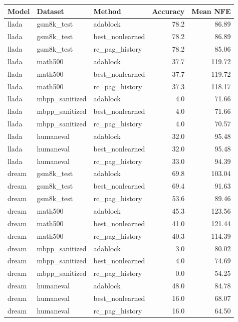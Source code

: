 \begin{tabular}{lllrr}
\toprule
Model & Dataset & Method & Accuracy & Mean NFE \\
\midrule
llada & gsm8k\_test & adablock & 78.2 & 86.89 \\
llada & gsm8k\_test & best\_nonlearned & 78.2 & 86.89 \\
llada & gsm8k\_test & rc\_pag\_history & 78.2 & 85.06 \\
llada & math500 & adablock & 37.7 & 119.72 \\
llada & math500 & best\_nonlearned & 37.7 & 119.72 \\
llada & math500 & rc\_pag\_history & 37.3 & 118.17 \\
llada & mbpp\_sanitized & adablock & 4.0 & 71.66 \\
llada & mbpp\_sanitized & best\_nonlearned & 4.0 & 71.66 \\
llada & mbpp\_sanitized & rc\_pag\_history & 4.0 & 70.57 \\
llada & humaneval & adablock & 32.0 & 95.48 \\
llada & humaneval & best\_nonlearned & 32.0 & 95.48 \\
llada & humaneval & rc\_pag\_history & 33.0 & 94.39 \\
dream & gsm8k\_test & adablock & 69.8 & 103.04 \\
dream & gsm8k\_test & best\_nonlearned & 69.4 & 91.63 \\
dream & gsm8k\_test & rc\_pag\_history & 53.6 & 89.46 \\
dream & math500 & adablock & 45.3 & 123.56 \\
dream & math500 & best\_nonlearned & 41.0 & 121.44 \\
dream & math500 & rc\_pag\_history & 40.3 & 114.39 \\
dream & mbpp\_sanitized & adablock & 3.0 & 80.02 \\
dream & mbpp\_sanitized & best\_nonlearned & 4.0 & 74.69 \\
dream & mbpp\_sanitized & rc\_pag\_history & 0.0 & 54.25 \\
dream & humaneval & adablock & 48.0 & 84.78 \\
dream & humaneval & best\_nonlearned & 16.0 & 68.07 \\
dream & humaneval & rc\_pag\_history & 16.0 & 64.50 \\
\bottomrule
\end{tabular}

